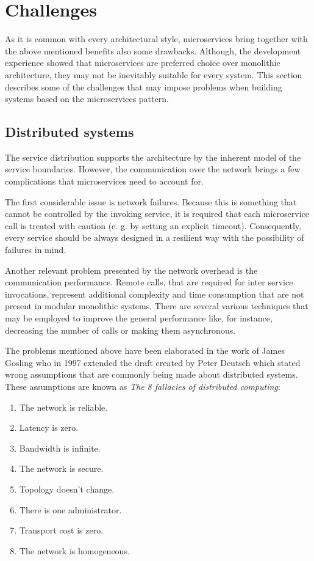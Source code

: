 \documentclass[oneside,
  digital, %
  table,   %
  lof,     %
  lot,     %
]{fithesis3}
\begin{document}
\section{Challenges}

As it is common with every architectural style, microservices bring together with the above mentioned benefits also some drawbacks. Although, the development experience showed that microservices are preferred choice over monolithic architecture, they may not be inevitably suitable for every system. This section describes some of the challenges that may impose problems when building systems based on the microservices pattern.

\subsection{Distributed systems}

The service distribution supports the architecture by the inherent model of the service boundaries. However, the communication over the network brings a few complications that microservices need to account for.

The first considerable issue is network failures. Because this is something that cannot be controlled by the invoking service, it is required that each microservice call is treated with caution (e. g. by setting an explicit timeout). Consequently, every service should be always designed in a resilient way with the possibility of failures in mind. 

Another relevant problem presented by the network overhead is the communication performance. Remote calls, that are required for inter service invocations, represent additional complexity and time consumption that are not present in modular monolithic systems. There are several various techniques that may be employed to improve the general performance like, for instance, decreasing the number of calls or making them asynchronous.

The problems mentioned above have been elaborated in the work of James Gosling who in 1997 extended the draft created by Peter Deutsch which stated wrong assumptions that are commonly being made about distributed systems. These assumptions are known as \textit{The 8 fallacies of distributed computing}:

\begin{enumerate}
    \item The network is reliable.
    \item Latency is zero.
    \item Bandwidth is infinite.
    \item The network is secure.
    \item Topology doesn't change.
    \item There is one administrator.
    \item Transport cost is zero.
    \item The network is homogeneous.
\end{enumerate}
\end{document}
